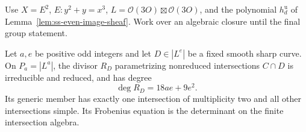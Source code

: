 Use $X=E^2$, $E:y^2+y=x^3$, $L=\mathcal O(3O)\boxtimes\mathcal O(3O)$,
and the polynomial $h_d^{\mathrm u}$ of
Lemma~\ref{lem:ss-even-image-sheaf}.
Work over an algebraic closure until the final group statement.

\begin{lemma}
\label{lem:ss-intersection-Hasse-degree}
Let $a,e$ be positive odd integers and let $D\in|L^e|$ be a fixed
smooth sharp curve. On $P_a=|L^a|$, the divisor $R_D$ parametrizing
nonreduced intersections $C\cap D$ is irreducible and reduced,
and has degree
\[
                       \deg R_D=18ae+9e^2.
\]
Its generic member has exactly one intersection of multiplicity
two and all other intersections simple. Its Frobenius equation
is the determinant on the finite intersection algebra.
\end{lemma}

